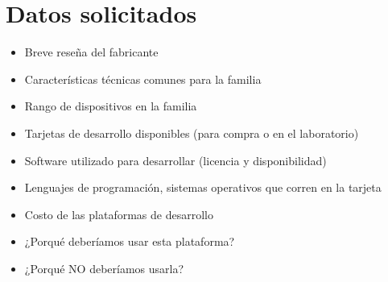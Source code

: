 \documentclass[letterpaper,10pt]{article}
\begin{document}

\section{Datos solicitados}
\begin{small}
\begin{itemize}
\item Breve reseña del fabricante
\item Características técnicas comunes para la familia
\item Rango de dispositivos en la familia
\item Tarjetas de desarrollo disponibles (para compra o en el laboratorio)
\item Software utilizado para desarrollar (licencia y disponibilidad)
\item Lenguajes de programación, sistemas operativos que corren en la tarjeta
\item Costo de las plataformas de desarrollo
\item ¿Porqué deberíamos usar esta plataforma?
\item ¿Porqué NO deberíamos usarla?
\end{itemize}
\end{small}
\end{document}
